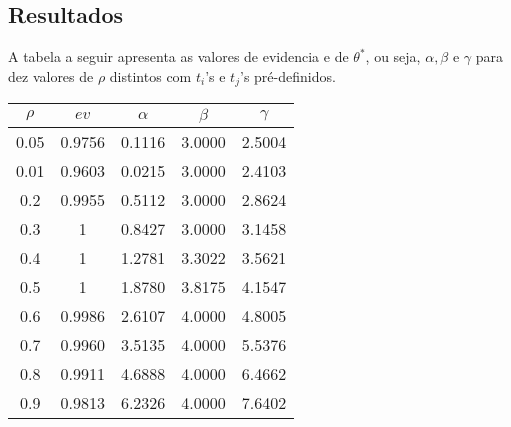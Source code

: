 \documentclass [a4paper,10pt]{article}
\newcommand{\n}[1]{\textbf{#1}}
\begin{document}
\subsection{Resultados}
A tabela a seguir apresenta as valores de evidencia e de $\theta^*$, ou seja, $\alpha, \beta$ e $\gamma$ para dez valores
de $\rho$ distintos com $t_i$'s e $t_j$'s pré-definidos.
{\linespread{1}
    \begin{center}
        \begin{tabular}{c c c c c}
            \toprule[0.11em]
            \n{$\rho$} & \n{$ev$} & \n{$\alpha$} & \n{$\beta$} & \n{$\gamma$}\\
            \toprule[0.11em]
            0.05 & 0.9756 & 0.1116  &  3.0000  &  2.5004\\ 
            \midrule
            0.01 & 0.9603 & 0.0215  &  3.0000  &  2.4103\\
            \midrule
            0.2 & 0.9955 & 0.5112  &  3.0000  &  2.8624\\
            \midrule
            0.3 & 1 & 0.8427  &  3.0000  &  3.1458\\
            \midrule
            0.4 & 1 & 1.2781  &  3.3022  &  3.5621\\
            \midrule
            0.5 & 1 & 1.8780  &  3.8175  &  4.1547\\
            \midrule
            0.6 & 0.9986 & 2.6107  &  4.0000  &  4.8005\\
            \midrule
            0.7 & 0.9960 & 3.5135  &  4.0000  &  5.5376\\
            \midrule
            0.8 & 0.9911 & 4.6888  &  4.0000  &  6.4662\\
            \midrule
            0.9 & 0.9813 & 6.2326  &  4.0000  &  7.6402\\
            \toprule[0.11em]
        \end{tabular}
\end{center}}
\end{document}
